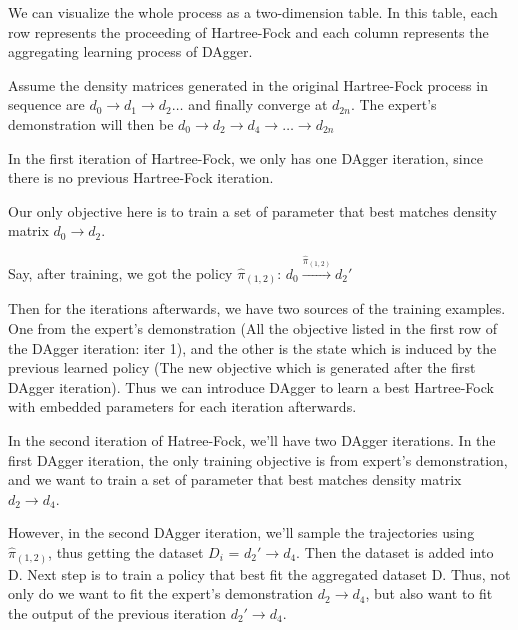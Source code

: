 \documentclass[twoside]{article}
\begin{document}
We can visualize the whole process as a two-dimension table. 
In this table, each row represents the proceeding of Hartree-Fock and each column represents the aggregating learning process of DAgger.
 
Assume the density matrices generated in the original Hartree-Fock process in sequence are  $d_0 \rightarrow  d_1 \rightarrow  d_2  \ldots  $ and finally converge at $d_{2n}$. The expert's demonstration will then be $d_0 \rightarrow d_2 \rightarrow  d_4 \rightarrow  \ldots \rightarrow  d_{2n}$

In the first iteration of Hartree-Fock, we only has one DAgger iteration, since there is no previous Hartree-Fock iteration. 

Our only objective here is to train a set of parameter that best matches density matrix $d_0 \rightarrow d_2$. 

Say, after training, we got the policy $\hat{\pi}_{(1,2)}$: $d_0 \xrightarrow{\hat{\pi}_{(1,2)}} d_{2}'$ 

Then for the iterations afterwards, we have two sources of the training examples.  One from the expert's demonstration (All the objective listed in the first row of the DAgger iteration: iter 1), and the other  is the state which is induced by the previous learned policy (The new objective which is generated after the first DAgger iteration). Thus we can introduce DAgger to learn a best Hartree-Fock with embedded parameters for each iteration afterwards.

In the second iteration of Hatree-Fock, we'll have two DAgger iterations. In the first DAgger iteration, the only training objective is from expert's demonstration, and we want to train a set of parameter that best matches density matrix $d_2 \rightarrow d_4$.

However, in the second DAgger iteration, we'll sample the trajectories using $\hat{\pi}_{(1,2)}$, thus getting the dataset $D_i$ = $d_2' \rightarrow d_4$. Then the dataset is added into D.
Next step is to train a policy that best fit the aggregated dataset D. Thus,  not only do we want to fit the expert's demonstration $d_2 \rightarrow d_4$, but also want to fit the output of the previous iteration $d_{2}' \rightarrow d_4$. 
\end{document}
